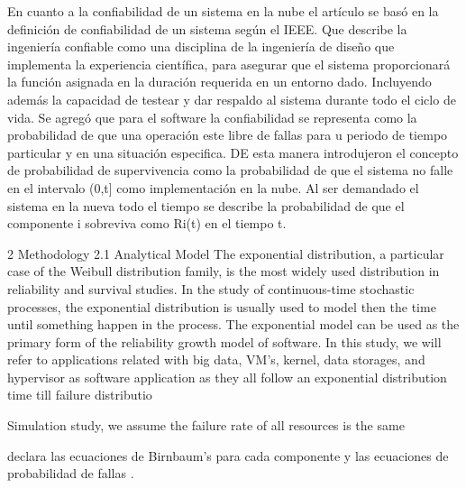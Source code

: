 En cuanto a la confiabilidad de un sistema en la nube el artículo se basó en la definición de confiabilidad de un sistema según el IEEE. Que describe la ingeniería confiable como una disciplina de la ingeniería de diseño que implementa la experiencia científica, para asegurar que el sistema proporcionará la función asignada en la duración requerida en un entorno dado. Incluyendo además la capacidad de testear y dar respaldo al sistema durante todo el ciclo de vida. Se agregó que para el software la confiabilidad se representa como la probabilidad de que una operación este libre de fallas para u periodo de tiempo particular y en una situación especifica.
DE esta manera introdujeron el concepto de probabilidad de supervivencia como la probabilidad de que el sistema no falle en el intervalo (0,t]  como implementación en la nube. Al ser demandado el sistema en la nueva todo el tiempo se describe la probabilidad de que el componente i sobreviva como Ri(t) en el tiempo t.



2 Methodology
2.1 Analytical Model
The exponential distribution, a particular case of the Weibull distribution family, is the
most widely used distribution in reliability and survival studies. In the study of
continuous-time stochastic processes, the exponential distribution is usually used to
model then the time until something happen in the process. The exponential model can
be used as the primary form of the reliability growth model of software. In this study,
we will refer to applications related with big data, VM’s, kernel, data storages, and
hypervisor as software application as they all follow an exponential distribution time
till failure distributio



Simulation
study, we assume the failure rate of all resources is the same


declara las ecuaciones de Birnbaum’s para cada componente y las ecuaciones de probabilidad de fallas .

